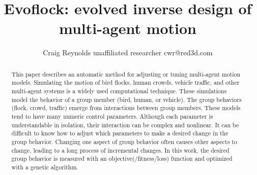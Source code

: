 \documentclass[letterpaper]{article}
\newcommand{\igfour}[1]{\texttt{[image: \#1]}}
\begin{document}
\title{Evoflock: evolved inverse design of multi-agent motion}
\author{Craig Reynolds\authorcr
    unaffiliated researcher\authorcr 
    cwr@red3d.com}



\captionsetup{hypcap=false}




\date{}

\maketitle



\begin{abstract}
    This paper describes an automatic method for adjusting or tuning multi-agent motion models. Simulating the motion of bird flocks, human crowds, vehicle traffic, and other multi-agent systems is a widely used computational technique. These simulations model the behavior of a group member (bird, human, or vehicle). The group behaviors (flock, crowd, traffic) emerge from interactions between group members. These models tend to have many numeric control parameters. Although each parameter is understandable in isolation, their interaction can be complex and nonlinear. It can be difficult to know how to adjust which parameters to make a desired change in the group behavior. Changing one aspect of group behavior often causes other aspects to change, leading to a long process of incremental changes. In this work, the desired group behavior is measured with an objective(/fitness/loss) function and optimized with a genetic algorithm.
\end{abstract}
\end{document}
